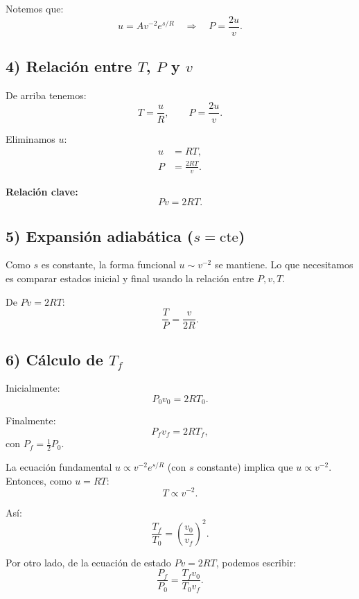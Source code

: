 \documentclass{article}
\begin{document}
Notemos que:
\[
u = A v^{-2} e^{s/R}
\quad\Longrightarrow\quad
P = \frac{2u}{v}.
\]


\subsection*{4) Relación entre $T$, $P$ y $v$}

De arriba tenemos:
\[
T = \frac{u}{R}, 
\qquad 
P = \frac{2u}{v}.
\]

Eliminamos \(u\):
\begin{equation*}
\begin{split}
u &= R T, \\[6pt]
P &= \frac{2 R T}{v}.
\end{split}
\end{equation*}

\medskip
\textcolor{Apple Green}{\textbf{Relación clave:}}
\[
P v = 2 R T.
\]


\subsection*{5) Expansión adiabática ($s=\mathrm{cte}$)}

Como \(s\) es constante, la forma funcional \(u \sim v^{-2}\) se mantiene.  
Lo que necesitamos es comparar estados inicial y final usando la relación entre \(P, v, T\).

De \(P v = 2 R T\):
\[
\frac{T}{P} = \frac{v}{2R}.
\]


\subsection*{6) Cálculo de $T_f$}

Inicialmente:
\[
P_0 v_0 = 2 R T_0.
\]

Finalmente:
\[
P_f v_f = 2 R T_f,
\]
con \(P_f = \tfrac{1}{2}P_0\).

\medskip
La ecuación fundamental \(u \propto v^{-2} e^{s/R}\) (con \(s\) constante) implica que \(u \propto v^{-2}\).  
Entonces, como \(u=RT\):
\[
T \propto v^{-2}.
\]

Así:
\[
\frac{T_f}{T_0} = \left(\frac{v_0}{v_f}\right)^{2}.
\]

\medskip
Por otro lado, de la ecuación de estado \(P v = 2 R T\), podemos escribir:
\[
\frac{P_f}{P_0} = \frac{T_f v_0}{T_0 v_f}.
\]
\end{document}
